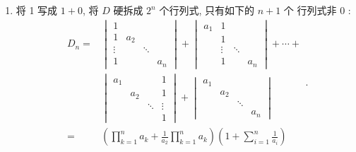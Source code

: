 \begin{enumerate}
\begin{enumerate}
        \item 将 1 写成 $1+0$, 将 $D$ 硬拆成 $2^{n}$ 个行列式, 只有如下的 $n+1$ 个 行列式非 0 :
        \[\begin{aligned}
        D_n =&\begin{vmatrix}
        1 & & & \\
        1 & a_{2} & & \\
        \vdots & & \ddots & \\
        1 & & & a_{n}
        \end{vmatrix}
        +\begin{vmatrix}
        a_{1} & 1 & \\
        & 1 & \\
        & \vdots & \ddots & \\
        & 1 & & a_{n}
        \end{vmatrix}+\cdots+\\
        &\begin{vmatrix}
        a_{1} & & &1 \\
        & a_{2} & & 1 \\
        & & \ddots & \vdots \\
        & & & 1
        \end{vmatrix}+\begin{vmatrix}
        a_{1} &  \\
        &a_{2}&\\
        & & \ddots & \\
        &&&a_n
        \end{vmatrix}\\
        =&\left(\prod_{k=1}^{n} a_{k}+\frac{1}{a_{2}} \prod_{k=1}^{n} a_{k}\right)\left(1+\sum_{i=1}^{n} \frac{1}{a_{i}}\right)
        \end{aligned}.\]
    \end{enumerate}


\end{enumerate}
